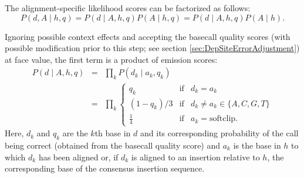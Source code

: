 \documentclass{article}
\begin{document}
%

The alignment-specific likelihood scores can be factorized as follows:
\begin{equation*}
\label{eq:al_lik}
P(d,A \mid h,q) = P(d \mid A,h,q)P(A \mid h,q) = P(d \mid A,h,q)P(A \mid h).
\end{equation*}

Ignoring possible context effects and accepting the basecall quality scores (with possible modification prior to this step; see section \ref{sec:DepSiteErrorAdjustment}) at face value, the first term is a product of emission scores:
\begin{eqnarray*}
P(d \mid A,h,q) & = & \prod_k P(d_k \mid a_k,q_k)\\
& = & \prod_k \left\{
                        \begin{array}{lcl}
                             q_k & \mathrm{if} & d_k=a_k\\
                             (1-q_k)/3 & \mathrm{if} &  d_k \neq a_k \in \{A,C,G,T\}\\
                             \frac{1}{4} & \mathrm{if} & a_k=\mathrm{softclip}.
                        \end{array}
                      \right.
\end{eqnarray*}
Here, $d_k$ and $q_k$ are the $k$th base in $d$ and its corresponding probability of the call being correct (obtained from the basecall quality score) and $a_k$ is the base in $h$ to which $d_k$ has been aligned or, if $d_k$ is aligned to an insertion relative to $h$, the corresponding base of the consensus insertion sequence.
\end{document}
